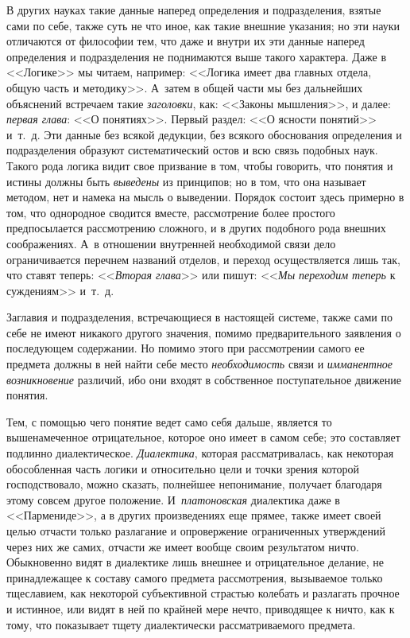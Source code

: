 В других науках такие данные наперед определения и подразделения, взятые
сами по себе, также суть не что иное, как такие внешние указания; но эти
науки отличаются от философии тем, что даже и внутри их эти данные наперед
определения и подразделения не поднимаются выше такого характера. Даже в
<<Логике>> мы читаем, например: <<Логика имеет два главных отдела, общую часть
и методику>>. А~затем в общей части мы без дальнейших объяснений встречаем
такие {\em заголовки}, как: <<Законы мышления>>, и далее:
{\em первая глава}: <<О понятиях>>. Первый раздел: <<О
ясности понятий>> и~т.~д. Эти данные без всякой дедукции, без всякого
обоснования определения и подразделения образуют систематический остов и
всю связь подобных наук. Такого рода логика видит свое призвание в том,
чтобы говорить, что понятия и истины должны быть
{\em выведены} из принципов; но в том, что она называет
методом, нет и намека на мысль о выведении. Порядок состоит здесь примерно
в том, что однородное сводится вместе, рассмотрение более простого
предпосылается рассмотрению сложного, и в других подобного рода внешних
соображениях. А~в отношении внутренней необходимой связи дело
ограничивается перечнем названий отделов, и переход осуществляется лишь
так, что ставят теперь: <<{\em Вторая глава}>> или пишут:
<<{\em Мы переходим теперь} к суждениям>> и~т.~д.

Заглавия и подразделения, встречающиеся в настоящей системе, также сами по
себе не имеют никакого другого значения, помимо предварительного заявления
о последующем содержании. Но помимо этого при рассмотрении самого ее
предмета должны в ней найти себе место {\em необходимость} связи и
{\em имманентное возникновение} различий, ибо они
входят в собственное поступательное движение понятия.

Тем, с помощью чего понятие ведет само себя дальше, является то
вышенамеченное отрицательное, которое оно имеет в самом себе; это
составляет подлинно диалектическое. {\em Диалектика},
которая рассматривалась, как некоторая обособленная часть логики и
относительно цели и точки зрения которой господствовало, можно сказать,
полнейшее непонимание, получает благодаря этому совсем другое положение.
И~{\em платоновская} диалектика даже в <<Пармениде>>, а в
других произведениях еще прямее, также имеет своей целью отчасти только
разлагание и опровержение ограниченных утверждений через них же самих,
отчасти же имеет вообще своим результатом ничто. Обыкновенно видят в
диалектике лишь внешнее и отрицательное делание, не принадлежащее к составу
самого предмета рассмотрения, вызываемое только тщеславием, как некоторой
субъективной страстью колебать и разлагать прочное и истинное, или видят в
ней по крайней мере нечто, приводящее к ничто, как к тому, что показывает
тщету диалектически рассматриваемого предмета.

